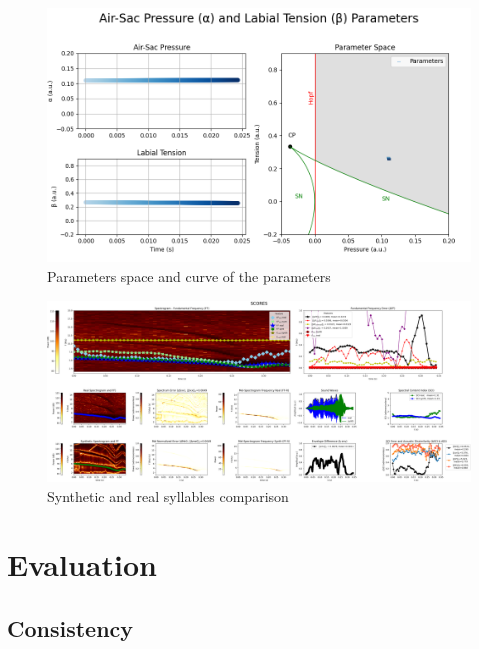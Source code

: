 \begin{figure}[H]
    \centering
    \includegraphics[width=\linewidth]{Images/Results/MotorGesturesParameters-chunck-synth-1-0.png}
    \caption{Parameters space and curve of the parameters}
    \label{fig:result_alphabeta}
\end{figure}

\begin{figure}[H]
    \centering
    \includegraphics[width=1.\linewidth]{Images/Results/ScoresVariables-syllable-1-1.png}
    \caption{Synthetic and real syllables comparison}
    \label{fig:result}
\end{figure}








\section{Evaluation}

\subsection{Consistency}

